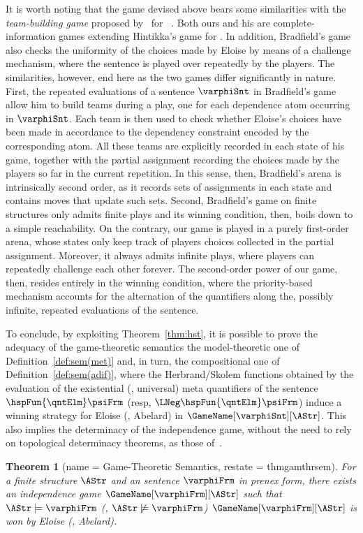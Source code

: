 \documentclass[authoryear]{elsarticle}
\newtheorem{theorem}{Theorem}
\begin{document}
It is worth noting that the game devised above bears some similarities with the
\emph{team-building game} proposed by~\cite{Bra13} for \DL~\citep{Vaa07}. Both
ours and his are complete-information games extending Hintikka's game for \FOL.
In addition, Bradfield's game also checks the uniformity of the choices made by
Eloise by means of a challenge mechanism, where the sentence is played over
repeatedly by the players.
The similarities, however, end here as the two games differ significantly in
nature.
%
First, the repeated evaluations of a sentence $\varphiSnt$ in Bradfield's game
allow him to build teams during a play, one for each dependence atom occurring
in $\varphiSnt$.
Each team is then used to check whether Eloise's choices have been made in
accordance to the dependency constraint encoded by the corresponding atom.
All these teams are explicitly recorded in each state of his game, together with
the partial assignment recording the choices made by the players so far in the
current repetition.
In this sense, then, Bradfield's arena is intrinsically second order, as it
records sets of assignments in each state and contains moves that update such
sets.
%
Second, Bradfield's game on finite structures only admits finite plays and its
winning condition, then, boils down to a simple reachability.
On the contrary, our game is played in a purely first-order arena, whose states
only keep track of players choices collected in the partial assignment.
Moreover, it always admits infinite plays, where players can repeatedly
challenge each other forever.
The second-order power of our game, then, resides entirely in the winning
condition, where the priority-based mechanism accounts for the alternation of
the quantifiers along the, possibly infinite, repeated evaluations of the
sentence.

To conclude, by exploiting Theorem~\ref{thm:hst}, it is possible to prove the
adequacy of the game-theoretic semantics \wrt the model-theoretic one of
Definition~\ref{def:sem(met)} and, in turn, \wrt the compositional one of
Definition~\ref{def:sem(adif)}, where the Herbrand/Skolem functions obtained by
the evaluation of the existential (\resp, universal) meta quantifiers of the
\Meta sentence $\hspFun{\qntElm} \psiFrm$ (resp, $\LNeg \hspFun{\qntElm}
\psiFrm$) induce a winning strategy for Eloise (\resp, Abelard) in
$\GameName[\varphiSnt][\AStr]$.
This also implies the determinacy of the independence game, without the need to
rely on topological determinacy theorems, as those of~\cite{Mar75,Mar85}.

\begin{theorem}[name = Game-Theoretic Semantics, restate = thmgamthrsem]
  \label{thm:gamthrsem}
  For a finite structure $\AStr$ and an \ADIF sentence $\varphiFrm$ in prenex
  form, there exists an independence game $\GameName[\varphiFrm][\AStr]$ such
  that $\AStr \models \varphiFrm$ (\resp, $\AStr \not\models \varphiFrm$) \iff
  $\GameName[\varphiFrm][\AStr]$ is won by Eloise (\resp, Abelard).
\end{theorem}
\end{document}
